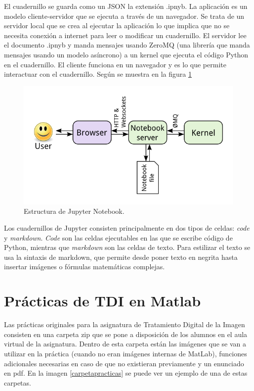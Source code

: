\documentclass[a4paper,12pt]{report}
\begin{document}
El cuadernillo se guarda como un JSON la extensión .ipnyb. La aplicación es un modelo cliente-servidor que se ejecuta a través de un navegador. Se trata de un servidor local que se crea al ejecutar la aplicación lo que implica que no se necesita conexión a internet para leer o modificar un cuadernillo.  El servidor lee el documento .ipnyb y manda mensajes usando ZeroMQ (una librería que manda mensajes usando un modelo asíncrono) a un kernel que ejecuta el código Python en el cuadernillo. El cliente funciona en un navegador y es lo que permite interactuar con el cuadernillo. Según se muestra en la figura \ref{estructurajupyter}
\begin{figure}[h]
\centering
\includegraphics[width=1.0\textwidth]{imagenes/estructurajupyter}
\caption{Estructura de Jupyter Notebook.}
\label{estructurajupyter}
\end{figure}

Los cuadernillos de Jupyter consisten principalmente en dos tipos de celdas: \emph{code} y \emph{markdown}.\emph{ Code }son las celdas ejecutables en las que se escribe código de Python, mientras que \emph{markdown} son las celdas de texto. Para estilizar el texto se usa  la sintaxis de markdown, que permite desde poner texto en negrita hasta insertar imágenes o fórmulas matemáticas complejas.\\




\section{Prácticas de TDI en Matlab}


Las prácticas originales para la asignatura de Tratamiento Digital de la Imagen consisten en una carpeta zip que se pone a disposición de los alumnos en el aula virtual de la asignatura. Dentro de esta carpeta están las imágenes que se van a utilizar en la práctica (cuando no eran imágenes internas de MatLab), funciones adicionales necesarias en caso de que no existieran previamente y un enunciado en pdf. En la imagen \ref{carpetapracticas} se puede ver un ejemplo de una de estas carpetas.
 
\end{document}
